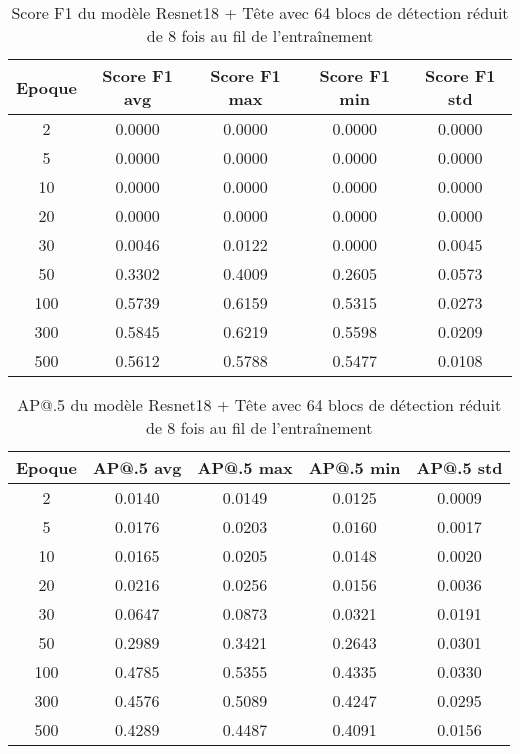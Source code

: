 \begin{table}[!ht]
    \caption{Score F1 du modèle Resnet18 + Tête avec 64 blocs de détection réduit de 8 fois au fil de l'entraînement}
    \label{tab:resnet18+head_64n_reduced_8x_f1score}
    \centering
    \begin{tabular}{ |c||c|c|c|c|  }
        \hline
        \rowcolor{gray!50}
        Epoque & Score F1 avg & Score F1 max & Score F1 min & Score F1 std\\
        \hline
        2 & 0.0000 & 0.0000 & 0.0000 & 0.0000\\
        5 & 0.0000 & 0.0000 & 0.0000 & 0.0000\\
        10 & 0.0000 & 0.0000 & 0.0000 & 0.0000\\
        20 & 0.0000 & 0.0000 & 0.0000 & 0.0000\\
        30 & 0.0046 & 0.0122 & 0.0000 & 0.0045\\
        50 & 0.3302 & 0.4009 & 0.2605 & 0.0573\\
        100 & 0.5739 & 0.6159 & 0.5315 & 0.0273\\
        300 & 0.5845 & 0.6219 & 0.5598 & 0.0209\\
        500 & 0.5612 & 0.5788 & 0.5477 & 0.0108\\
        \hline
    \end{tabular}
\end{table}

\begin{table}[!ht]
    \caption{AP@.5 du modèle Resnet18 + Tête avec 64 blocs de détection réduit de 8 fois au fil de l'entraînement}
    \label{tab:resnet18+head_64n_reduced_8x_ap50}
    \centering
    \begin{tabular}{ |c||c|c|c|c|  }
        \hline
        \rowcolor{gray!50}
        Epoque & AP@.5 avg & AP@.5 max & AP@.5 min & AP@.5 std\\
        \hline
        2 & 0.0140 & 0.0149 & 0.0125 & 0.0009\\
        5 & 0.0176 & 0.0203 & 0.0160 & 0.0017\\
        10 & 0.0165 & 0.0205 & 0.0148 & 0.0020\\
        20 & 0.0216 & 0.0256 & 0.0156 & 0.0036\\
        30 & 0.0647 & 0.0873 & 0.0321 & 0.0191\\
        50 & 0.2989 & 0.3421 & 0.2643 & 0.0301\\
        100 & 0.4785 & 0.5355 & 0.4335 & 0.0330\\
        300 & 0.4576 & 0.5089 & 0.4247 & 0.0295\\
        500 & 0.4289 & 0.4487 & 0.4091 & 0.0156\\
        \hline
    \end{tabular}
\end{table}

